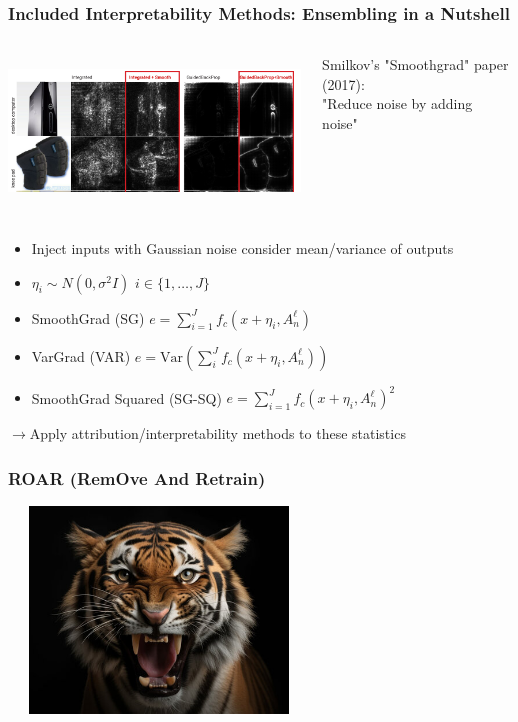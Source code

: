 \documentclass{beamer}
\theoremstyle{mystyle}
\begin{document}
\begin{frame}
    \frametitle{Included Interpretability Methods: Ensembling in a Nutshell}
    \begin{columns}[T] %
        \begin{column}{0.7\textwidth}
            \includegraphics[width=1.0\textwidth, height=4cm]{compareSGBP.png}
        \end{column}
        \begin{column}{0.3\textwidth}
		Smilkov's "Smoothgrad" paper (2017): \\
		"Reduce noise by adding noise"
        \end{column}
    \end{columns}
    \begin{itemize}
        \item Inject inputs with Gaussian noise consider mean/variance of outputs \pause
        \item $\eta_i \sim N(0, \sigma ^2 I)$ $i\in \{1,\ldots, J\} $ \pause
        \item SmoothGrad (SG) $e = \sum_{i=1}^{J} {f_c( x + \eta_i, A_n^{\ell}) }$ \pause
        \item VarGrad (VAR) $e = \text{Var}\left(  \sum_{i}^{J} {f_c(x + \eta_i, A_n^{\ell})}\right) $ \pause
        \item SmoothGrad Squared (SG-SQ) $e = \sum_{i=1}^{J} {f_c( x + \eta_i, A_n^{\ell})^{2} }$\pause
    \end{itemize}
$\to$Apply attribution/interpretability methods to these statistics
\end{frame}


\begin{frame}
	\frametitle{ROAR (RemOve And Retrain)}
	\includegraphics[height=5.5cm, width=8cm]{tiger.png}\\
\end{frame}
\end{document}
